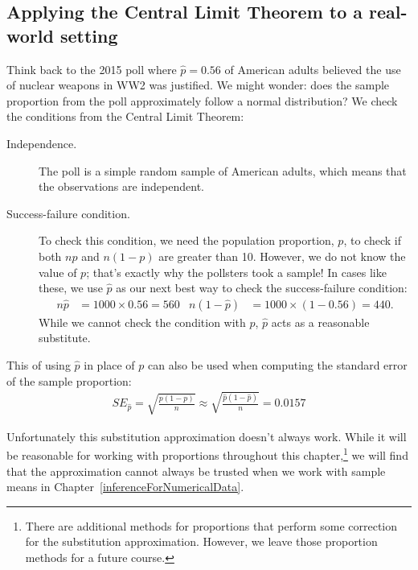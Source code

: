 

\subsection{Applying the Central Limit Theorem to a real-world setting}

Think back to the 2015 poll where
$\hat{p} = 0.56$ of American adults believed the use of nuclear
weapons in WW2 was justified. We might wonder: does the sample
proportion from the poll approximately follow a normal
distribution? We check the conditions from the Central
Limit Theorem:
\begin{description}
\item[Independence.] The poll is a simple random sample of
    American adults, which means that the observations are
    independent.
\item[Success-failure condition.] To check this condition,
    we need the population proportion, $p$, to check if both
    $np$ and $n(1-p)$ are greater than 10. However, we do not
    know the value of $p$; that's exactly why the pollsters
    took a sample! In cases like these, we use $\hat{p}$ as
    our next best way to check the success-failure condition:
    \begin{align*}
    n\hat{p} &= 1000 \times 0.56 = 560
    &n (1 - \hat{p}) &= 1000 \times (1 - 0.56) = 440.
    \end{align*}
    While we cannot check the condition with $p$,
    $\hat{p}$ acts as a reasonable substitute.
\end{description}

This  of using $\hat{p}$ in
place of $p$ can also be used when computing the standard error
of the sample proportion:
\begin{align*}
SE_{\hat{p}}
    = \sqrt{\frac{p (1 - p)}{n}}
    \approx \sqrt{\frac{\hat{p} (1 - \hat{p})}{n}}
    = 0.0157
\end{align*}

Unfortunately this substitution approximation doesn't always work.
While it will be reasonable for working with proportions
throughout this chapter,\footnote{There are additional methods
for proportions that perform some correction for the substitution
approximation. However, we leave those proportion methods for
a future course.}
we will find that the approximation cannot always be trusted
when we work with sample means in
Chapter~\ref{inferenceForNumericalData}.



